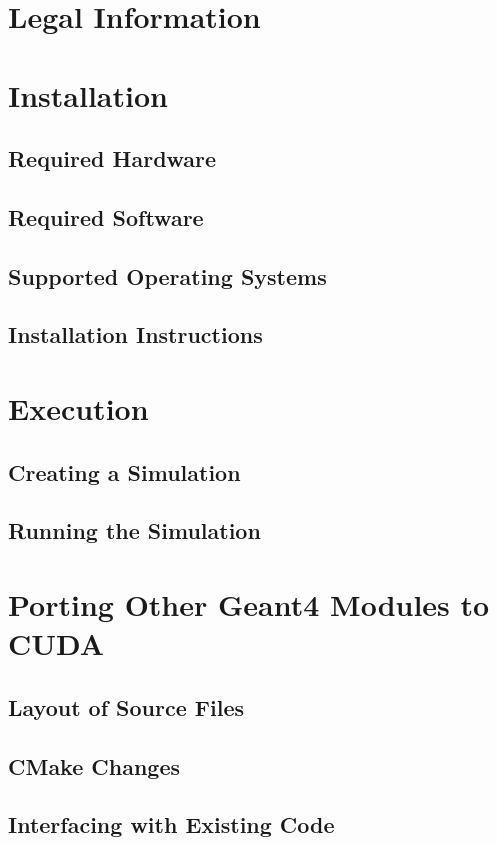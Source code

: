 \documentclass[12pt]{article}
\begin{document}
\section{Legal Information}	%

\section{Installation} %
\subsection{Required Hardware} %
\subsection{Required Software} %
\subsection{Supported Operating Systems} %
\subsection{Installation Instructions} %

\section{Execution} %
\subsection{Creating a Simulation} %
\subsection{Running the Simulation} %

\section{Porting Other Geant4 Modules to CUDA} %
\subsection{Layout of Source Files} %
\subsection{CMake Changes} %
\subsection{Interfacing with Existing Code} %
\end{document}
